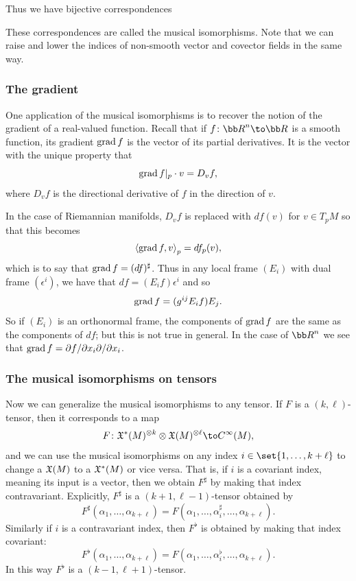Thus we have bijective correspondences

\medskip
\centerline{\vbox{\jot{}}}
\medskip

These correspondences are called the {\emphcolor musical isomorphisms}.
Note that we can raise and lower the indices of non-smooth vector and covector fields in the same way.

\subsubsection*{The gradient}

One application of the musical isomorphisms is to recover the notion of the gradient of a real-valued function.
Recall that if $f\colon\bR^n\to\bR$ is a smooth function, its gradient $\mathop{\rm grad}\nolimits f$ is the vector of its partial derivatives.
It is the vector with the unique property that
$$ \mathop{\rm grad}\nolimits f|_p\cdot v = D_vf , $$
where $D_vf$ is the directional derivative of $f$ in the direction of $v$.

In the case of Riemannian manifolds, $D_vf$ is replaced with $df(v)$ for $v\in T_pM$ so that this becomes
$$ \mathopen{}\mathclose{\left<\mathop{\rm grad}\nolimits f,v\right>}_p = df_p(v) , $$
which is to say that $\mathop{\rm grad}\nolimits f=(df)^\sharp$.
Thus in any local frame $(E_i)$ with dual frame $(\epsilon^i)$, we have that $df=(E_if)\epsilon^i$ and so
$$ \mathop{\rm grad}\nolimits f = (g^{ij}E_if)E_j . $$
So if $(E_i)$ is an orthonormal frame, the components of $\mathop{\rm grad}\nolimits f$ are the same as the components of $df$; but this is not true in general.
In the case of $\bR^n$ we see that $\mathop{\rm grad}\nolimits f=\partial f/\partial x_i\partial /\partial x_i$.

\subsubsection*{The musical isomorphisms on tensors}

Now we can generalize the musical isomorphisms to any tensor.
If $F$ is a $(k,\ell)$-tensor, then it corresponds to a map
$$ F\colon\X^*(M)^{\otimes k}\otimes\X(M)^{\otimes\ell} \to C^\infty(M) , $$
and we can use the musical isomorphisms on any index $i\in\set{1,\dots,k+\ell}$ to change a ${\frak X}(M)$ to a ${\frak X}^*(M)$ or vice versa.
That is, if $i$ is a covariant index, meaning its input is a vector, then we obtain $F^\sharp$ by making that index contravariant.
Explicitly, $F^\sharp$ is a $(k+1,\ell-1)$-tensor obtained by
$$ F^\sharp(\alpha_1,\dots,\alpha_{k+\ell}) = F(\alpha_1,\dots,\alpha_i^\sharp,\dots,\alpha_{k+\ell}) . $$
Similarly if $i$ is a contravariant index, then $F^\flat$ is obtained by making that index covariant:
$$ F^\flat(\alpha_1,\dots,\alpha_{k+\ell}) = F(\alpha_1,\dots,\alpha_i^\flat,\dots,\alpha_{k+\ell}) . $$
In this way $F^\flat$ is a $(k-1,\ell+1)$-tensor.

